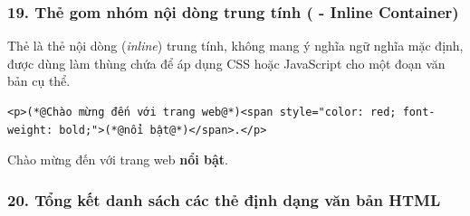 \subsubsection{19. Thẻ gom nhóm nội dòng trung tính ( - Inline Container)}

Thẻ  là thẻ nội dòng (\textit{inline}) trung tính, không mang ý nghĩa ngữ nghĩa mặc định, được dùng làm thùng chứa để áp dụng CSS hoặc JavaScript cho một đoạn văn bản cụ thể.

\begin{codeWindow}
\begin{lstlisting}[language=HTML5]
<p>(*@Chào mừng đến với trang web@*)<span style="color: red; font-weight: bold;">(*@nổi bật@*)</span>.</p>
\end{lstlisting}
\end{codeWindow}

\begin{tcolorbox}[
    enhanced, colback=white, colframe=primaryBlue!20, arc=6pt, boxrule=0.8pt, drop shadow=black!3!white,
    top=8pt, bottom=8pt, left=12pt, right=12pt,
    title={\sffamily\bfseries\scriptsize\color{codeComment} KẾT QUẢ HIỂN THỊ TRÊN TRÌNH DUYỆT (BROWSER PREVIEW)},
    coltitle=codeComment, colbacktitle=codeBg!80!white
]
Chào mừng đến với trang web \textbf{\color{red}nổi bật}.
\end{tcolorbox}

\subsubsection{20. Tổng kết danh sách các thẻ định dạng văn bản HTML}


